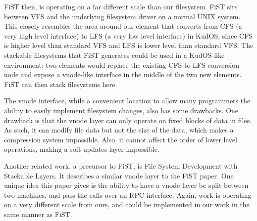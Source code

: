 FiST then, is operating on a far different scale than our
filesystem. FiST sits between VFS and the underlying filesystem driver
on a normal UNIX system. This closely resembles the area around our
element that converts from CFS (a very high level interface) to LFS (a
very low level interface) in KudOS, since CFS is higher level than
standard VFS and LFS is lower level than standard VFS. The stackable
filesystems that FiST generates could be used in a KudOS-like
environment: two elements would replace the existing CFS to LFS
conversion node and expose a vnode-like interface in the middle of the
two new elements. FiST can then stack filesystems here.

The vnode interface, while a convenient location to allow many
programmers the ability to easily implement filesystem changes, also
has some drawbacks. One drawback is that the vnode layer can only
operate on fixed blocks of data in files. As such, it can modify file
data but not the size of the data, which makes a compression system
impossible. Also, it cannot affect the order of lower level
operations, making a soft updates layer impossible.

Another related work, a precursor to FiST, is File System Development
with Stackable Layers. It describes a similar vnode layer to the FiST
paper. One unique idea this paper gives is the ability to have a vnode
layer be split between two machines, and pass the calls over an RPC
interface. Again, work is operating on a very different scale from
ours, and could be implemented in our work in the same manner as FiST.
